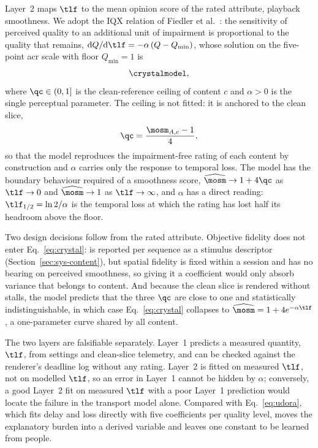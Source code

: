 Layer~2 maps $\tlf$ to the mean opinion score of the rated attribute,
playback smoothness. We adopt the IQX relation of Fiedler et
al.~\cite{fiedler2010}: the sensitivity of perceived quality to an
additional unit of impairment is proportional to the quality that
remains, $\mathrm{d}Q/\mathrm{d}\tlf = -\alpha\,(Q - Q_{\min})$, whose
solution on the five-point \gls{acr} scale with floor $Q_{\min} = 1$ is
\begin{equation}
  \crystalmodel,
  \label{eq:crystal}
\end{equation}
where $\qc \in (0, 1]$ is the clean-reference ceiling of content $c$
and $\alpha > 0$ is the single perceptual parameter. The ceiling is
not fitted: it is anchored to the clean slice,
\begin{equation}
  \qc = \frac{\mosm_{A,c} - 1}{4},
  \label{eq:ceiling}
\end{equation}
so that the model reproduces the impairment-free rating of each
content by construction and $\alpha$ carries only the response to
temporal loss. The model has the boundary behaviour required of a
smoothness score, $\widehat{\mosm} \to 1 + 4\qc$ as $\tlf \to 0$ and
$\widehat{\mosm} \to 1$ as $\tlf \to \infty$, and $\alpha$ has a direct
reading: $\tlf_{1/2} = \ln 2/\alpha$ is the temporal loss at which the
rating has lost half its headroom above the floor.

Two design decisions follow from the rated attribute. Objective
fidelity does not enter Eq.~\eqref{eq:crystal}: \pcqm is reported per
sequence as a stimulus descriptor (Section~\ref{sec:sys-content}), but
spatial fidelity is fixed within a session and has no bearing on
perceived smoothness, so giving it a coefficient would only absorb
variance that belongs to content. And because the clean slice is
rendered without stalls, the model predicts that the three $\qc$ are
close to one and statistically indistinguishable, in which case
Eq.~\eqref{eq:crystal} collapses to $\widehat{\mosm} = 1 + 4e^{-\alpha\tlf}$,
a one-parameter curve shared by all content.

The two layers are falsifiable separately. Layer~1 predicts a measured
quantity, $\tlf$, from settings and clean-slice telemetry, and can be
checked against the renderer's deadline log without any rating.
Layer~2 is fitted on measured $\tlf$, not on modelled $\tlf$, so an
error in Layer~1 cannot be hidden by $\alpha$; conversely, a good
Layer~2 fit on measured $\tlf$ with a poor Layer~1 prediction would
locate the failure in the transport model alone. Compared with
Eq.~\eqref{eq:udora}, which fits delay and loss directly with five
coefficients per quality level, \crystal moves the explanatory burden
into a derived variable and leaves one constant to be learned from
people.

